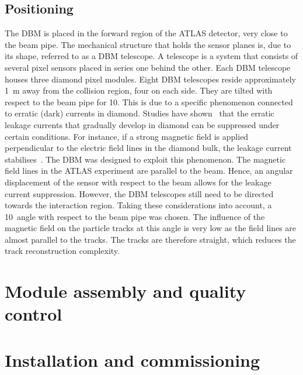 \documentclass[12pt]{packages/mytustyle}  %
\begin{document}
\subsection{Positioning}
The DBM is placed in the forward region of the ATLAS detector, very close to the beam pipe. The mechanical structure that holds the sensor planes is, due to its shape, referred to as a DBM telescope. A telescope is a system that consists of several pixel sensors placed in series one behind the other. Each DBM telescope houses three diamond pixel modules. Eight DBM telescopes reside approximately 1~m away from the collision region, four on each side. They are tilted with respect to the beam pipe for 10\textdegree. This is due to a specific phenomenon connected to erratic (dark) currents in diamond. Studies have shown~\cite{} that the erratic leakage currents that gradually develop in diamond can be suppressed under certain conditions. For instance, if a strong magnetic field is applied perpendicular to the electric field lines in the diamond bulk, the leakage current stabilises~\cite{}. The DBM was designed to exploit this phenomenon. The magnetic field lines in the ATLAS experiment are parallel to the beam. Hence, an angular displacement of the sensor with respect to the beam allows for the leakage current suppression. However, the DBM telescopes still need to be directed towards the interaction region. Taking these considerations into account, a 10\textdegree~angle with respect to the beam pipe was chosen. The influence of the magnetic field on the particle tracks at this angle is very low as the field lines are almost parallel to the tracks. The tracks are therefore straight, which reduces the track reconstruction complexity.



\section{Module assembly and quality control}
\label{sec:modass}


\section{Installation and commissioning}
\label{sec:installationcomm}
\end{document}
